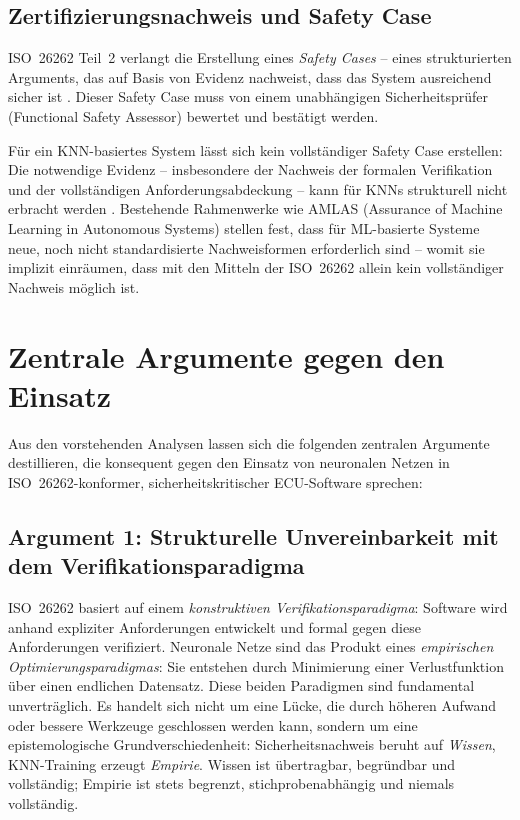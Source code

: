 ﻿\documentclass[12pt,a4paper]{article}
\begin{document}
\subsection{Zertifizierungsnachweis und Safety Case}
\label{subsec:safety_case}

ISO~26262 Teil~2 verlangt die Erstellung eines \emph{Safety Cases} -- eines
strukturierten Arguments, das auf Basis von Evidenz nachweist, dass das System
ausreichend sicher ist \cite{iso26262_2}. Dieser Safety Case muss von einem
unabh\"angigen Sicherheitsprüfer (Functional Safety Assessor) bewertet und
best\"atigt werden.

F\"ur ein KNN-basiertes System l\"asst sich kein vollst\"andiger Safety Case
erstellen: Die notwendige Evidenz -- insbesondere der Nachweis der formalen
Verifikation und der vollst\"andigen Anforderungsabdeckung -- kann f\"ur KNNs
strukturell nicht erbracht werden \cite{AMLAS2021}. Bestehende Rahmenwerke wie
AMLAS (Assurance of Machine Learning in Autonomous Systems) \cite{AMLAS2021}
stellen fest, dass f\"ur ML-basierte Systeme neue, noch nicht standardisierte
Nachweisformen erforderlich sind -- womit sie implizit einr\"aumen, dass mit den
Mitteln der ISO~26262 allein kein vollst\"andiger Nachweis m\"oglich ist.

\section{Zentrale Argumente gegen den Einsatz}
\label{sec:argumente}

Aus den vorstehenden Analysen lassen sich die folgenden zentralen Argumente
destillieren, die konsequent gegen den Einsatz von neuronalen Netzen in
ISO~26262-konformer, sicherheitskritischer ECU-Software sprechen:

\subsection{Argument 1: Strukturelle Unvereinbarkeit mit dem Verifikationsparadigma}
\label{subsec:arg1}

ISO~26262 basiert auf einem \emph{konstruktiven Verifikationsparadigma}: Software
wird anhand expliziter Anforderungen entwickelt und formal gegen diese Anforderungen
verifiziert. Neuronale Netze sind das Produkt eines \emph{empirischen Optimierungsparadigmas}:
Sie entstehen durch Minimierung einer Verlustfunktion \"uber einen endlichen Datensatz.
Diese beiden Paradigmen sind fundamental unvertr\"aglich. Es handelt sich nicht um eine
L\"ucke, die durch h\"oheren Aufwand oder bessere Werkzeuge geschlossen werden kann,
sondern um eine epistemologische Grundverschiedenheit: Sicherheitsnachweis beruht
auf \emph{Wissen}, KNN-Training erzeugt \emph{Empirie}. Wissen ist übertragbar,
begr\"undbar und vollst\"andig; Empirie ist stets begrenzt, stichprobenabh\"angig
und niemals vollst\"andig.
\end{document}
